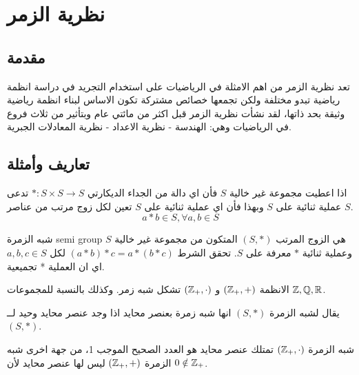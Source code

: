 \chapter{نظرية الزمر}

\section*{مقدمة}
تعد نظرية الزمر من اهم الامثلة في الرياضيات على استخدام التجريد في دراسة انظمة رياضية تبدو مختلفة ولكن تجمعها خصائص مشتركة تكون الاساس لبناء انظمة رياضية وثيقة بحد ذاتها، لقد نشأت نظرية الزمر قبل اكثر من مائتي عام وبتأثير من ثلاث فروع في الرياضيات وهي: الهندسة - نظرية الاعداد - نظرية المعادلات الجبرية.

\vfill
\newpage

\section{تعاريف وأمثلة}

\begin{definition}
	اذا اعطيت مجموعة غير خالية $S$ فأن اي دالة من الجداء الديكارتي 
	$* : S\times S\to S$ تدعى عملية ثنائية على $S$ وبهذا فأن اي عملية ثنائية على $S$ تعين لكل زوج مرتب من عناصر $S$. 
	\[
	a*b\in S, \forall a, b\in S
	\]
\end{definition}

\begin{definition}
	شبه الزمرة semi group هي الزوج المرتب $(S, *)$ المتكون من مجموعة غير خالية $S$ وعملية ثنائية $*$ معرفة على $S$. تحقق الشرط
	$(a * b) * c = a * (b * c)$ لكل $a,b,c \in S$ اي ان العملية * تجميعية.
\end{definition}

\begin{example}
	الانظمة 
	$(\mathbb{Z}_+, +)$ و $(\mathbb{Z}_+, \cdot)$ تشكل شبه زمر. وكذلك بالنسبة للمجموعات $\mathbb{Z}, \mathbb{Q}, \mathbb{R}$.
\end{example}

\begin{definition}
	يقال لشبه الزمرة $(S, *)$ انها شبه زمرة بعنصر محايد اذا وجد عنصر محايد وحيد لــ $(S, *)$.
\end{definition}

\begin{example}
	شبه الزمرة $(\mathbb{Z}_+, \cdot)$ تمتلك عنصر محايد هو العدد الصحيح الموجب 1، من جهة اخرى شبه الزمرة $(\mathbb{Z}_+, +)$ ليس لها عنصر محايد لأن $0\notin \mathbb{Z}_+$.
\end{example}


